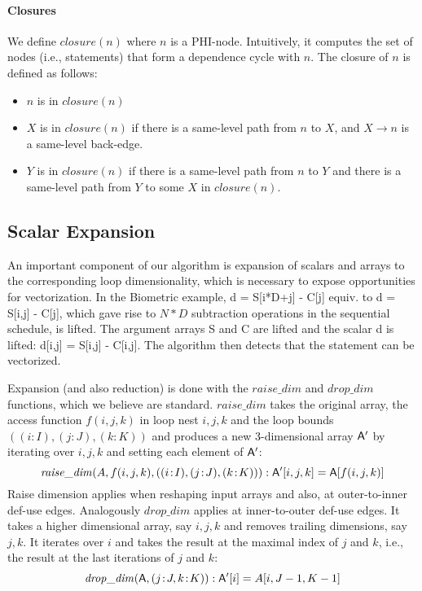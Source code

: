 \paragraph{Closures}
We define $\mathit{closure}(n)$ where $n$ is a PHI-node. Intuitively, it computes the set of nodes (i.e., statements) that form a dependence cycle with $n$. The closure of $n$ is defined as follows:
\begin{itemize}
\item $n$ is in $\mathit{closure}(n)$
\item $X$ is in $\mathit{closure}(n)$ if there is a same-level path from $n$ to $X$, and $X \rightarrow n$ is a same-level back-edge.
\item $Y$ is in $\mathit{closure}(n)$ if there is a same-level path from $n$ to $Y$ and there is a same-level path from $Y$ to some $X$ in $\mathit{closure}(n)$.
\end{itemize}

\subsection{Scalar Expansion}
\label{sec:expansion}


An important component of our algorithm is expansion of scalars and arrays to the corresponding loop dimensionality, 
which is necessary to expose opportunities for vectorization.
In the Biometric example, {\sf d = S[i*D+j] - C[j]} equiv. to {\sf d = S[i,j] - C[j]}, which gave rise to $N*D$ subtraction operations in the sequential schedule,
is lifted. The argument arrays {\sf S} and {\sf C} are lifted and the scalar {\sf d} is lifted: {\sf d[i,j] = S[i,j] - C[i,j]}.
The algorithm then detects that the statement can be vectorized.

Expansion (and also reduction) is done with the $\mathit{raise\_dim}$ and $\mathit{drop\_dim}$ functions, 
which we believe are standard. $\mathit{raise\_dim}$ takes the original array, the access function 
$f(i,j,k)$ in loop nest $i,j,k$ and the loop bounds $((i\!:\!I),(j\!:\!J),(k\!:\!K))$ and produces a new 3-dimensional array 
${\sf A'}$ by iterating over $i,j,k$ and setting each element of  ${\sf A'}$:
\[ \mathit{raise\_dim}(A, f(i,j,k), ((i\!:\!I),(j\!:\!J),(k\!:\!K))): {\sf A'}[i,j,k] =  {\sf A}[f(i,j,k)] \]
Raise dimension applies when reshaping input arrays and also, at outer-to-inner def-use edges.
Analogously $\mathit{drop\_dim}$ applies at inner-to-outer def-use edges.
It takes a higher dimensional array, say $i,j,k$ and removes trailing dimensions, say $j,k$. 
It iterates over $i$ and takes the result at the maximal index of $j$ and $k$, i.e., the result at the last iterations of $j$ and $k$:
\[ \mathit{drop\_dim}({\sf A}, (j\!:\!J,k\!:\!K)): {\sf A'}[i] = A[i,J-1,K-1] \] 


